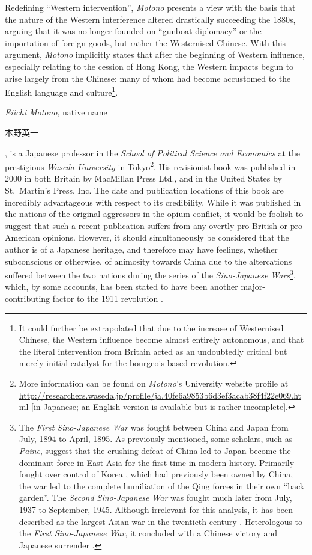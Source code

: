 \documentclass{article}
\newcommand{\jap}[1]{%
        \begin{CJK}{UTF8}{min}%
                \normalfont%
                #1
        \end{CJK}
}
\begin{document}
        Redefining ``Western intervention'', \textit{Motono} presents a view with the basis that the nature of the Western interference altered drastically succeeding the 1880s, arguing that it was no longer founded on ``gunboat diplomacy'' or the importation of foreign goods, but rather the Westernised Chinese. With this argument, \textit{Motono} implicitly states that after the beginning of Western influence, especially relating to the cession of Hong Kong, the Western impacts begun to arise largely from the Chinese: many of whom had become accustomed to the English language and culture\footnote{It could further be extrapolated that due to the increase of Westernised Chinese, the Western influence become almost entirely autonomous, and that the literal intervention from Britain acted as an undoubtedly critical but merely initial catalyst for the bourgeois-based revolution.}.

        

        \textit{Eiichi Motono}, native name \jap{本野英一}, is a Japanese professor in the \textit{School of Political Science and Economics} at the prestigious \textit{Waseda University} in Tokyo\footnote{More information can be found on \textit{Motono}'s University website profile at \url{http://researchers.waseda.jp/profile/ja.40fe6a9853b6d3ef3acab38f4f22e069.html} [in Japanese; an English version is available but is rather incomplete].}. His revisionist book was published in 2000 in both Britain by MacMillan Press Ltd., and in the United States by St.\ Martin's Press, Inc. The date and publication locations of this book are incredibly advantageous with respect to its credibility. While it was published in the nations of the original aggressors in the opium conflict, it would be foolish to suggest that such a recent publication suffers from any overtly pro-British or pro-American opinions. However, it should simultaneously be considered that the author is of a Japanese heritage, and therefore may have feelings, whether subconscious or otherwise, of animosity towards China due to the altercations suffered between the two nations during the series of the \textit{Sino-Japanese Wars}\footnote{The \textit{First Sino-Japanese War} was fought between China and Japan from  July, 1894 to  April, 1895. As previously mentioned, some scholars, such as \textit{Paine}, suggest that the crushing defeat of China led to Japan become the dominant force in East Asia for the first time in modern history. Primarily fought over control of Korea \autocite{Olender:2014}, which had previously been owned by China, the war led to the complete humiliation of the Qing forces in their own ``back garden''. The \textit{Second Sino-Japanese War} was fought much later from  July, 1937 to  September, 1945. Although irrelevant for this analysis, it has been described as the largest Asian war in the twentieth century \autocite{Bix:1992}. Heterologous to the \textit{First Sino-Japanese War}, it concluded with a Chinese victory and Japanese surrender \autocite{Kitamura:2014}.}, which, by some accounts, has been stated to have been another major-contributing factor to the 1911 revolution \autocite{Paine:2009}.
\end{document}
